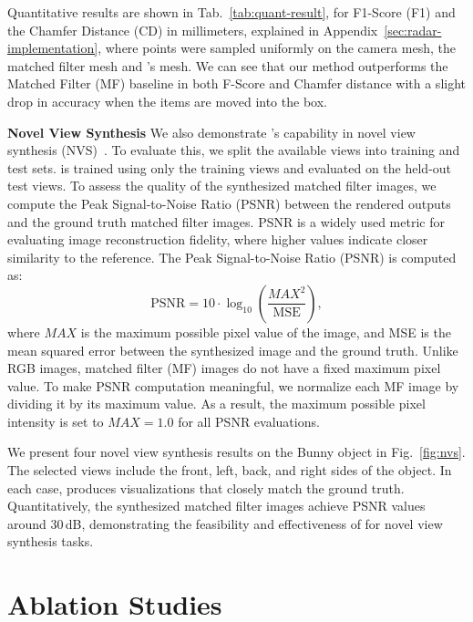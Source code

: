 Quantitative results are shown in Tab.~\ref{tab:quant-result}, for F1-Score (F1) and the Chamfer Distance (CD) in millimeters, explained in Appendix~\ref{sec:radar-implementation}, where points were sampled uniformly on the camera mesh, the matched filter mesh and \name{}'s mesh. We can see that our method outperforms the Matched Filter (MF) baseline in both F-Score and Chamfer distance with a slight drop in accuracy when the items are moved into the box.



\noindent \textbf{Novel View Synthesis} We also demonstrate \name{}'s capability in novel view synthesis  (NVS)~\cite{mildenhall2021nerf}.
To evaluate this, we split the available views into training and test sets. \name{} is trained using only the training views and evaluated on the held-out test views.
To assess the quality of the synthesized matched filter images, we compute the Peak Signal-to-Noise Ratio (PSNR) between the rendered outputs and the ground truth matched filter images.
PSNR is a widely used metric for evaluating image reconstruction fidelity, where higher values indicate closer similarity to the reference.
The Peak Signal-to-Noise Ratio (PSNR) is computed as:
\begin{equation}
\text{PSNR} = 10 \cdot \log_{10} \left( \frac{MAX^2}{\text{MSE}} \right),
\end{equation}
where \( MAX \) is the maximum possible pixel value of the image, and MSE is the mean squared error between the synthesized image and the ground truth.
Unlike RGB images, matched filter (MF) images do not have a fixed maximum pixel value.
To make PSNR computation meaningful, we normalize each MF image by dividing it by its maximum value.
As a result, the maximum possible pixel intensity is set to \( MAX = 1.0 \) for all PSNR evaluations.


We present four novel view synthesis results on the Bunny object in Fig.~\ref{fig:nvs}.
The selected views include the front, left, back, and right sides of the object.
In each case, \name{} produces visualizations that closely match the ground truth.
Quantitatively, the synthesized matched filter images achieve PSNR values around 30\,dB, demonstrating the feasibility and effectiveness of \name{} for novel view synthesis tasks.



\section{Ablation Studies}
\label{sec:ablation}
